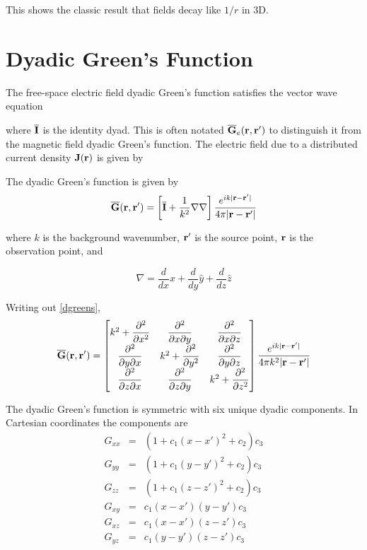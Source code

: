 This shows the classic result that fields decay like $1/r$ in 3D. 

\section{Dyadic Green's Function}

The free-space electric field dyadic Green's function satisfies the vector wave equation \cite{chew1995waves,tai1994dyadic}

\noindent where $\overline{\mathbf{I}}$ is the identity dyad. This is often notated $\overline{\mathbf{G}}_e(\mathbf{r},\mathbf{r}')$ to distinguish it from the magnetic field dyadic Green's function.  The electric field due to a distributed current density $\mathbf{J}(\mathbf{r})$ is given by 


The dyadic Green's function is given by 
\begin{equation}
 \overline{\mathbf{G}}(\mathbf{r},\mathbf{r}') = \left[\overline{\mathbf{I}} + \dfrac{1}{k^2} \nabla\nabla \right] \dfrac{e^{ik\vert \mathbf{r} - \mathbf{r}' \vert}}{4\pi \vert \mathbf{r} - \mathbf{r}' \vert} \label{dgreens}
 \end{equation}

\noindent where $k$ is the background wavenumber, $\mathbf{r}'$ is the source point, $\mathbf{r}$ is the observation point, and 

\begin{equation}
\nabla = \dfrac{d}{dx} \hat{x} + \dfrac{d}{dy} \hat{y}  + \dfrac{d}{dz} \hat{z} 
\end{equation}


Writing out \eqref{dgreens},
\begin{equation}
\overline{\mathbf{G}}(\mathbf{r},\mathbf{r}')  = \begin{bmatrix} {k^2 + \dfrac{\partial^2}{\partial x^2}} & {\dfrac{\partial^2}{\partial x\partial y}} & {\dfrac{\partial^2}{\partial x\partial z}} \\ {\dfrac{\partial^2}{\partial y\partial x}} & {k^2 + \dfrac{\partial^2}{\partial y^2}} & {\dfrac{\partial^2}{\partial y\partial z}} \\ {\dfrac{\partial^2}{\partial z\partial x}} & {\dfrac{\partial^2}{\partial z\partial y}} & {k^2 + \dfrac{\partial^2}{\partial z^2}} \end{bmatrix}
\dfrac{e^{ik\vert \mathbf{r} - \mathbf{r}' \vert}}{4\pi k^2 \vert \mathbf{r} - \mathbf{r}' \vert}
\end{equation}

The dyadic Green's function is symmetric with six unique dyadic components. In Cartesian coordinates the components are 
\begin{eqnarray}
G_{xx} &=& (1+c_1(x-x')^2+c_2)c_3 \\
G_{yy} &=& (1+c_1(y-y')^2+c_2)c_3 \\ 
G_{zz} &=& (1+c_1(z-z')^2+c_2)c_3 \\
G_{xy} &=& c_1(x-x')(y-y')c_3 \\
G_{xz} &=& c_1(x-x')(z-z')c_3 \\ 
G_{yz} &=& c_1(y-y')(z-z')c_3 
\end{eqnarray}

